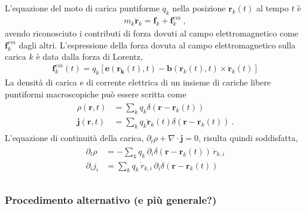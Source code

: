 \documentclass[letterpaper,10pt,english]{jupyterBook}
\begin{document}
\sphinxAtStartPar
{}
L’equazione del moto di carica puntiforme \(q_k\) nella posizione \(\mathbf{r}_k(t)\) al tempo \(t\) è
\begin{equation*}
\begin{split}m_k \ddot{\mathbf{r}}_k = \mathbf{f}_k + \mathbf{f}_k^{em} \ ,\end{split}
\end{equation*}
\sphinxAtStartPar
avendo riconosciuto i contributi di forza dovuti al campo elettromagnetico come \(\mathbf{f}_k^{em}\) dagli altri. L’espressione della forza dovuta al campo elettromagnetico sulla carica \(k\) è data dalla forza di Lorentz,
\begin{equation*}
\begin{split}\mathbf{f}_k^{em}(t) = q_k \left[ \mathbf{e}(\mathbf{r_k}(t), t) - \mathbf{b}(\mathbf{r}_k(t), t) \times \dot{\mathbf{r}}_k(t) \right]\end{split}
\end{equation*}
\sphinxAtStartPar
{} La densità di carica e di corrente elettrica di un insieme di cariche libere puntiformi macroscopiche può essere scritta come
\begin{equation*}
\begin{split}\begin{aligned}
  \rho(\mathbf{r},t) & = \sum_k q_k \delta(\mathbf{r} - \mathbf{r}_k(t)) \\
  \mathbf{j}(\mathbf{r},t) & = \sum_k q_k \dot{\mathbf{r}}_k(t) \delta(\mathbf{r} - \mathbf{r}_k(t)) \ .
\end{aligned}\end{split}
\end{equation*}
\sphinxAtStartPar
L’equazione di continuità della carica, \(\partial_t \rho + \nabla \cdot \mathbf{j} = 0\), risulta quindi soddisfatta,
\begin{equation*}
\begin{split}\begin{aligned}
  \partial_t \rho &  = - \sum_k q_k \, \partial_i \delta(\mathbf{r} - \mathbf{r}_k(t)) \, \dot{r}_{k,i} \\
  \partial_i j_i  &  =   \sum_k q_k \, \dot{r}_{k,i} \, \partial_i \delta(\mathbf{r} - \mathbf{r}_k(t)) \\
\end{aligned}\end{split}
\end{equation*}\subsubsection*{Procedimento alternativo (e più generale?)}
\end{document}
